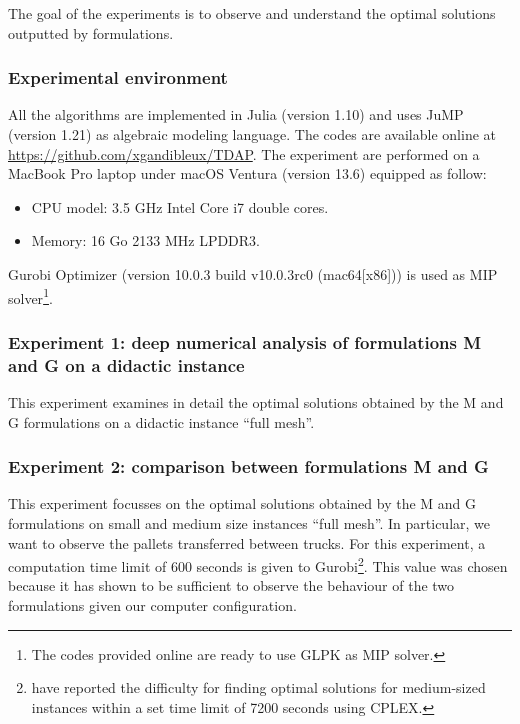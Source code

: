 \documentclass[preprint,12pt,authoryear]{elsarticle}
\begin{document}
The goal of the experiments is to observe and understand the optimal solutions outputted by formulations.


%
%
\subsubsection{Experimental environment}

All the algorithms are implemented in Julia (version 1.10) and uses JuMP (version 1.21) as algebraic modeling language.
The codes are available online at \url{https://github.com/xgandibleux/TDAP}.
The experiment are performed on a  MacBook Pro laptop under macOS Ventura (version 13.6) equipped as follow:
\begin{itemize}
    \item CPU model: 3.5 GHz Intel Core i7 double cores.
    \item Memory: 16 Go 2133 MHz LPDDR3.
\end{itemize}
Gurobi Optimizer (version 10.0.3 build v10.0.3rc0 (mac64[x86]))  is used as MIP solver\footnote{The codes provided online are ready to use GLPK as MIP solver.}.  

%
%
\subsubsection{Experiment 1: deep numerical analysis of formulations M and G on a didactic instance}\label{sec:didacticMG}

This experiment examines in detail  the optimal solutions obtained by the M and G formulations on a didactic instance
 ``full mesh''.

%
%
\subsubsection{Experiment 2: comparison between formulations M and G}\label{sec:resMG}

This experiment focusses on  the optimal solutions obtained by the M and G formulations on small and medium size instances
 ``full mesh''.
%
In particular, we want to observe the pallets transferred between trucks.
%
For this experiment, a computation time limit of 600 seconds is given to Gurobi\footnote{\citet{MIAO2009} have reported the difficulty for finding optimal solutions for medium-sized instances within a set time limit of 7200 seconds using CPLEX.}.
This value was chosen because it has shown to be sufficient to observe the behaviour of the two formulations given our computer configuration.
\end{document}
